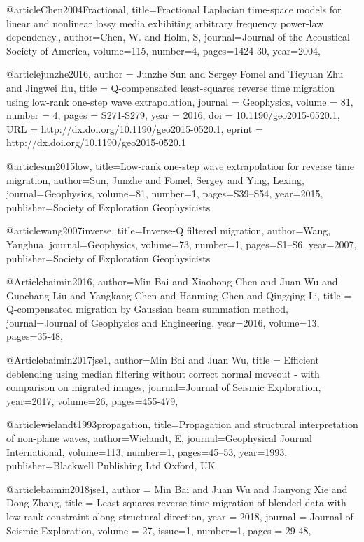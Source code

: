 @article{Chen2004Fractional,
  title={Fractional Laplacian time-space models for linear and nonlinear lossy media exhibiting arbitrary frequency power-law dependency.},
  author={Chen, W. and Holm, S},
  journal={Journal of the Acoustical Society of America},
  volume={115},
  number={4},
  pages={1424-30},
  year={2004},
}

@article{junzhe2016,
author = {Junzhe Sun and Sergey Fomel and Tieyuan Zhu and Jingwei Hu},
title = {Q-compensated least-squares reverse time migration using low-rank one-step wave extrapolation},
journal = {Geophysics},
volume = {81},
number = {4},
pages = {S271-S279},
year = {2016},
doi = {10.1190/geo2015-0520.1},
URL = {http://dx.doi.org/10.1190/geo2015-0520.1},
eprint = {http://dx.doi.org/10.1190/geo2015-0520.1}
}

@article{sun2015low,
  title={Low-rank one-step wave extrapolation for reverse time migration},
  author={Sun, Junzhe and Fomel, Sergey and Ying, Lexing},
  journal={Geophysics},
  volume={81},
  number={1},
  pages={S39--S54},
  year={2015},
  publisher={Society of Exploration Geophysicists}
}

@article{wang2007inverse,
  title={Inverse-{Q} filtered migration},
  author={Wang, Yanghua},
  journal={Geophysics},
  volume={73},
  number={1},
  pages={S1--S6},
  year={2007},
  publisher={Society of Exploration Geophysicists}
}

@Article{baimin2016,
  author={Min Bai and Xiaohong Chen and Juan Wu and Guochang Liu and Yangkang Chen and Hanming Chen and Qingqing Li},
  title = {Q-compensated migration by Gaussian beam summation method},
  journal={Journal of Geophysics and Engineering},
  year=2016,
  volume=13,
  pages={35-48},
}

@Article{baimin2017jse1,
  author={Min Bai and Juan Wu},
  title = {Efficient deblending using median filtering without correct normal moveout - with comparison on migrated images},
  journal={Journal of Seismic Exploration},
  year=2017,
  volume=26,
  pages={455-479},
}

@article{wielandt1993propagation,
  title={Propagation and structural interpretation of non-plane waves},
  author={Wielandt, E},
  journal={Geophysical Journal International},
  volume={113},
  number={1},
  pages={45--53},
  year={1993},
  publisher={Blackwell Publishing Ltd Oxford, UK}
}

@article{baimin2018jse1,
  author =	 {Min Bai and Juan Wu and Jianyong Xie and Dong Zhang},
  title =	 {Least-squares reverse time migration of blended data with low-rank constraint along structural direction},
  year =	 2018,
  journal =	 {Journal of Seismic Exploration},
  volume =	 27,
  issue=1,
  number=1,
  pages =	 {29-48},
}

